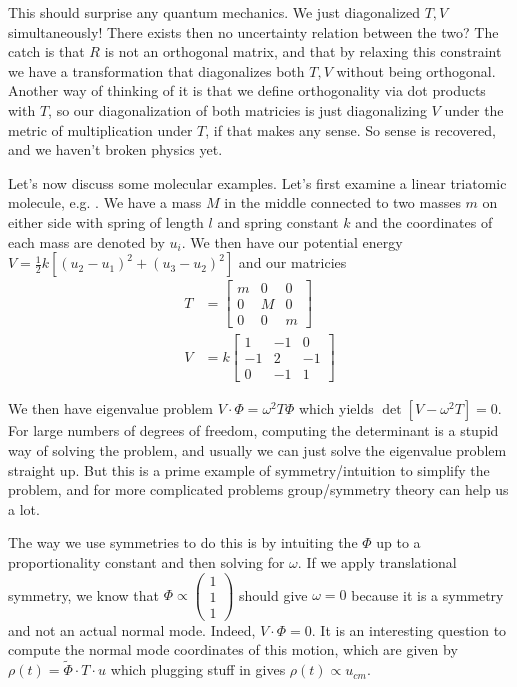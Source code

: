 \documentclass[10pt]{report}
\begin{document}
This should surprise any quantum mechanics. We just diagonalized $T,V$ simultaneously! There exists then no uncertainty relation between the two? The catch is that $R$ is not an orthogonal matrix, and that by relaxing this constraint we have a transformation that diagonalizes both $T,V$ without being orthogonal. Another way of thinking of it is that we define orthogonality via dot products with $T$, so our diagonalization of both matricies is just diagonalizing $V$ under the metric of multiplication under $T$, if that makes any sense. So sense is recovered, and we haven't broken physics yet.

Let's now discuss some molecular examples. Let's first examine a linear triatomic molecule, e.g. . We have a mass $M$ in the middle connected to two masses $m$ on either side with spring of length $l$ and spring constant $k$ and the coordinates of each mass are denoted by $u_i$. We then have our potential energy $V = \frac{1}{2}k\left[ (u_2 - u_1)^2 + (u_3 - u_2)^2 \right]$ and our matricies
\begin{align*}
    T &= \begin{bmatrix} m & 0 & 0\\0 & M & 0\\0 & 0 & m \end{bmatrix} \\
    V &= k\begin{bmatrix} 1 & -1 & 0 \\ -1 & 2 & -1 \\ 0 & -1 & 1 \end{bmatrix} 
\end{align*}

We then have eigenvalue problem $V\cdot \Phi = \omega^2 T\Phi$ which yields $\det\left[ V - \omega^2 T \right] = 0$. For large numbers of degrees of freedom, computing the determinant is a stupid way of solving the problem, and usually we can just solve the eigenvalue problem straight up. But this is a prime example of symmetry/intuition to simplify the problem, and for more complicated problems group/symmetry theory can help us a lot.

The way we use symmetries to do this is by intuiting the $\Phi$ up to a proportionality constant and then solving for $\omega$. If we apply translational symmetry, we know that $\Phi \propto \begin{pmatrix} 1\\1\\1 \end{pmatrix} $ should give $\omega = 0$ because it is a symmetry and not an actual normal mode. Indeed, $V\cdot \Phi = 0$. It is an interesting question to compute the normal mode coordinates of this motion, which are given by $\rho(t) = \tilde{\Phi}\cdot T \cdot u$ which plugging stuff in gives $\rho(t) \propto u_{cm}$.
\end{document}

